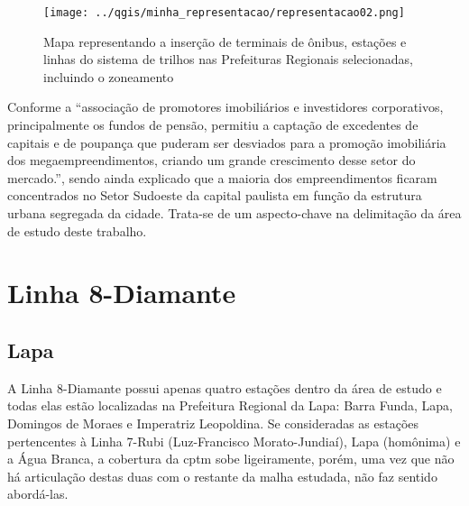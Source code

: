 	\begin{figure}[p!]
		\caption{Mapa representando a inserção de terminais de ônibus, estações e linhas do sistema de trilhos nas Prefeituras Regionais selecionadas, incluindo o zoneamento}
		\texttt{[image: ../qgis/minha\_representacao/representacao02.png]}
	\end{figure}
	
	Conforme  a ``associação de promotores imobiliários e investidores corporativos, principalmente os fundos de pensão, permitiu a captação de excedentes de capitais e de poupança que puderam ser desviados para a promoção imobiliária dos megaempreendimentos, criando um grande crescimento desse setor do mercado.'', sendo ainda explicado que a maioria dos empreendimentos ficaram concentrados no Setor Sudoeste da capital paulista em função da estrutura urbana segregada da cidade. Trata-se de um aspecto-chave na delimitação da área de estudo deste trabalho.
	
	

%
%


	\section{Linha 8-Diamante} \label{L8}
	
	\subsection{Lapa} \label{Lapa}
	
	A Linha 8-Diamante possui apenas quatro estações dentro da área de estudo e todas elas estão localizadas na Prefeitura Regional da Lapa: Barra Funda, Lapa, Domingos de Moraes e Imperatriz Leopoldina. Se consideradas as estações pertencentes à Linha 7-Rubi (Luz-Francisco Morato-Jundiaí), Lapa (homônima) e a Água Branca, a cobertura da \gls{cptm} sobe ligeiramente, porém, uma vez que não há articulação destas duas com o restante da malha estudada, não faz sentido abordá-las.
	
